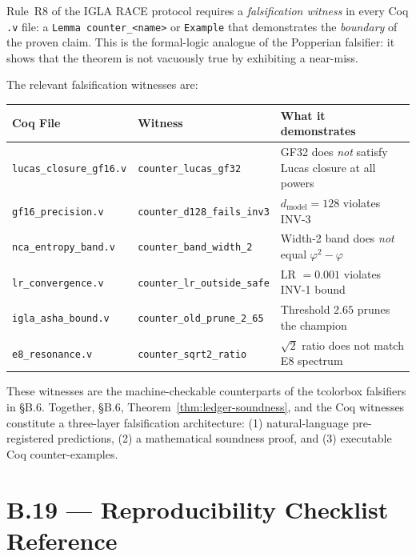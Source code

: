 \noindent Rule~R8 of the IGLA RACE protocol requires a
\emph{falsification witness} in every Coq \texttt{.v} file:
a \texttt{Lemma counter\_<name>} or \texttt{Example} that demonstrates
the \emph{boundary} of the proven claim.  This is the formal-logic analogue
of the Popperian falsifier: it shows that the theorem is not vacuously true
by exhibiting a near-miss.

\medskip

\noindent The relevant falsification witnesses are:

\begin{center}
\begin{tabular}{lll}
\hline
\textbf{Coq File} & \textbf{Witness} & \textbf{What it demonstrates} \\
\hline
\texttt{lucas\_closure\_gf16.v} & \texttt{counter\_lucas\_gf32} &
  GF32 does \emph{not} satisfy Lucas closure at all powers \\
\texttt{gf16\_precision.v} & \texttt{counter\_d128\_fails\_inv3} &
  $d_{\mathrm{model}} = 128$ violates INV-3 \\
\texttt{nca\_entropy\_band.v} & \texttt{counter\_band\_width\_2} &
  Width-2 band does \emph{not} equal $\varphi^{2} - \varphi$ \\
\texttt{lr\_convergence.v} & \texttt{counter\_lr\_outside\_safe} &
  LR $= 0.001$ violates INV-1 bound \\
\texttt{igla\_asha\_bound.v} & \texttt{counter\_old\_prune\_2\_65} &
  Threshold $2.65$ prunes the champion \\
\texttt{e8\_resonance.v} & \texttt{counter\_sqrt2\_ratio} &
  $\sqrt{2}$ ratio does not match E8 spectrum \\
\hline
\end{tabular}
\end{center}

\noindent These witnesses are the machine-checkable counterparts of the
tcolorbox falsifiers in §B.6.  Together, §B.6, Theorem~\ref{thm:ledger-soundness},
and the Coq witnesses constitute a three-layer falsification
architecture: (1) natural-language pre-registered predictions, (2) a
mathematical soundness proof, and (3) executable Coq counter-examples.

\section*{B.19 — Reproducibility Checklist Reference}
\label{sec:reproducibility}

